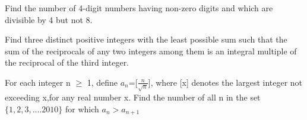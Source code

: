 \item Find the number of 4-digit numbers  having non-zero digits and which are divisible by 4 but not 8.

\item Find three distinct positive integers with the least possible sum such that the sum of the
reciprocals of any two integers among them is an integral multiple of the reciprocal of the third integer.

\item For each integer n $\geq$ 1, define $a_n$=[$\frac{n}{\sqrt{n}}$], where [x] denotes the largest integer not exceeding x,for any real number x. Find the number of all n in the set $\{1,2,3,....2010\}$ for which $a_n > a_{n+1}$
